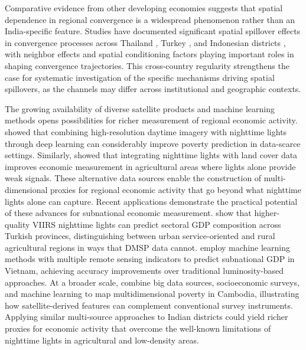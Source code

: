 \documentclass[
  a4paper, 
  twoside,
  review
]{article}
\begin{document}
Comparative evidence from other developing economies suggests that
spatial dependence in regional convergence is a widespread phenomenon
rather than an India-specific feature. Studies have documented
significant spatial spillover effects in convergence processes across
Thailand \citep{tipayalai_mendez_thailand}, Turkey
\citep{ursavas_mendez_turkey}, and Indonesian districts
\citep{miranti_mendez_indonesia}, with neighbor effects and spatial
conditioning factors playing important roles in shaping convergence
trajectories. This cross-country regularity strengthens the case for
systematic investigation of the specific mechanisms driving spatial
spillovers, as the channels may differ across institutional and
geographic contexts.

The growing availability of diverse satellite products and machine
learning methods opens possibilities for richer measurement of regional
economic activity. \citet{jean_etal_poverty_prediction} showed that
combining high-resolution daytime imagery with nighttime lights through
deep learning can considerably improve poverty prediction in data-scarce
settings. Similarly, \citet{keola_etal_lights_poverty} showed that
integrating nighttime lights with land cover data improves economic
measurement in agricultural areas where lights alone provide weak
signals. These alternative data sources enable the construction of
multi-dimensional proxies for regional economic activity that go beyond
what nighttime lights alone can capture. Recent applications demonstrate
the practical potential of these advances for subnational economic
measurement. \citet{chen_etal_turkey_viirs} show that higher-quality
VIIRS nighttime lights can predict sectoral GDP composition across
Turkish provinces, distinguishing between urban service-oriented and
rural agricultural regions in ways that DMSP data cannot.
\citet{hussein_etal_vietnam_ml} employ machine learning methods with
multiple remote sensing indicators to predict subnational GDP in
Vietnam, achieving accuracy improvements over traditional
luminosity-based approaches. At a broader scale,
\citet{theara_etal_cambodia_poverty} combine big data sources,
socioeconomic surveys, and machine learning to map multidimensional
poverty in Cambodia, illustrating how satellite-derived features can
complement conventional survey instruments. Applying similar
multi-source approaches to Indian districts could yield richer proxies
for economic activity that overcome the well-known limitations of
nighttime lights in agricultural and low-density areas.
\end{document}
